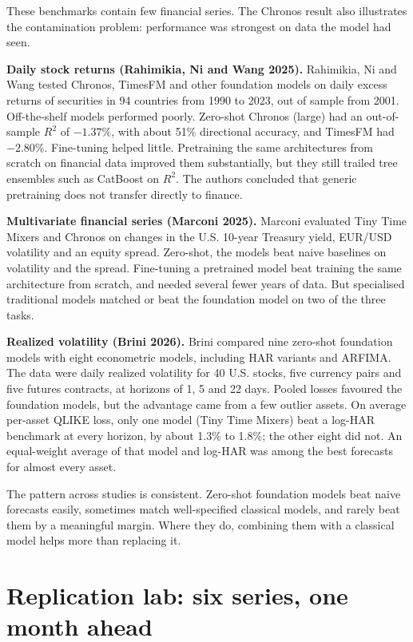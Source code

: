 These benchmarks contain few financial series. The Chronos result also illustrates the contamination problem: performance was strongest on data the model had seen.

\textbf{Daily stock returns (Rahimikia, Ni and Wang 2025).} Rahimikia, Ni and Wang tested Chronos, TimesFM and other foundation models on daily excess returns of securities in 94 countries from 1990 to 2023, out of sample from 2001. Off-the-shelf models performed poorly. Zero-shot Chronos (large) had an out-of-sample $R^2$ of $-1.37\%$, with about 51\% directional accuracy, and TimesFM had $-2.80\%$. Fine-tuning helped little. Pretraining the same architectures from scratch on financial data improved them substantially, but they still trailed tree ensembles such as CatBoost on $R^2$. The authors concluded that generic pretraining does not transfer directly to finance.

\textbf{Multivariate financial series (Marconi 2025).} Marconi evaluated Tiny Time Mixers and Chronos on changes in the U.S. 10-year Treasury yield, EUR/USD volatility and an equity spread. Zero-shot, the models beat naive baselines on volatility and the spread. Fine-tuning a pretrained model beat training the same architecture from scratch, and needed several fewer years of data. But specialised traditional models matched or beat the foundation model on two of the three tasks.

\textbf{Realized volatility (Brini 2026).} Brini compared nine zero-shot foundation models with eight econometric models, including HAR variants and ARFIMA. The data were daily realized volatility for 40 U.S. stocks, five currency pairs and five futures contracts, at horizons of 1, 5 and 22 days. Pooled losses favoured the foundation models, but the advantage came from a few outlier assets. On average per-asset QLIKE loss, only one model (Tiny Time Mixers) beat a log-HAR benchmark at every horizon, by about 1.3\% to 1.8\%; the other eight did not. An equal-weight average of that model and log-HAR was among the best forecasts for almost every asset.

The pattern across studies is consistent. Zero-shot foundation models beat naive forecasts easily, sometimes match well-specified classical models, and rarely beat them by a meaningful margin. Where they do, combining them with a classical model helps more than replacing it.

\section{Replication lab: six series, one month ahead}
\label{sec:22-lab}

